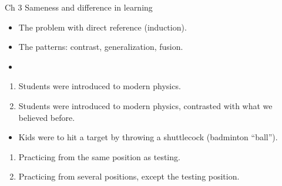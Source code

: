 \begin{frame}
  \begin{block}{Ch 3 Sameness and difference in learning}
    \begin{itemize}
      \item The problem with direct reference (induction).
      \item The patterns: contrast, generalization, fusion.
      \item {}
    \end{itemize}
  \end{block}
\end{frame}

\begin{frame}
  \begin{example}[Physics]
    \begin{enumerate}
      \item Students were introduced to modern physics.
      \item Students were introduced to modern physics, contrasted with what we 
        believed before.
    \end{enumerate}
  \end{example}
\end{frame}

\begin{frame}
  \begin{example}
    \begin{itemize}
      \item Kids were to hit a target by throwing a shuttlecock (badminton 
        \enquote{ball}).
    \end{itemize}
    \begin{enumerate}
      \item Practicing from the same position as testing.
      \item Practicing from several positions, except the testing position.
    \end{enumerate}
  \end{example}
\end{frame}

